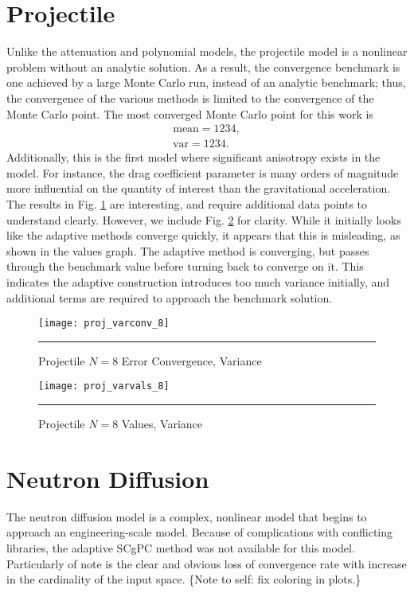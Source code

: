 \section{Projectile}
Unlike the attenuation and polynomial models, the projectile model is a nonlinear problem without an analytic
solution.  As a result, the convergence benchmark is one achieved by a large Monte Carlo run, instead of an
analytic benchmark; thus, the convergence of the various methods is limited to the convergence of the Monte
Carlo point.  The most converged Monte Carlo point for this work is
\begin{align}
  \text{mean} = 1234, \\
  \text{var} = 1234.
\end{align}
Additionally, this is the first model where significant anisotropy exists in the model.  For instance, the
drag coefficient parameter is many orders of magnitude more influential on the quantity of interest than the
gravitational acceleration.  
The results in Fig. \ref{fig:proj_varconv} are interesting, and require additional data points to understand
clearly.  However, we include Fig. \ref{fig:proj_varval} for clarity.  While it initially looks like the adaptive
methods converge quickly, it appears that this is misleading, as shown in the values graph.  The adaptive
method is converging, but passes through the benchmark value before turning back to converge on it.  This
indicates the adaptive construction introduces too much variance initially, and additional terms are required
to approach the benchmark solution.
\begin{figure}[H]
  \centering
    \texttt{[image: proj\_varconv\_8]}
    \rule{35em}{0.5pt}
  \caption{Projectile $N=8$ Error Convergence, Variance}
  \label{fig:proj_varconv}
\end{figure}
\begin{figure}[H]
  \centering
    \texttt{[image: proj\_varvals\_8]}
    \rule{35em}{0.5pt}
  \caption{Projectile $N=8$ Values, Variance}
  \label{fig:proj_varval}
\end{figure}



\section{Neutron Diffusion}
The neutron diffusion model is a complex, nonlinear model that begins to approach an engineering-scale model.
Because of complications with conflicting libraries, the adaptive SCgPC method was not available for this
model.  Particularly of note is the clear and obvious loss of convergence rate with increase in the
cardinality of the input space. \{Note to self: fix coloring in plots.\}


